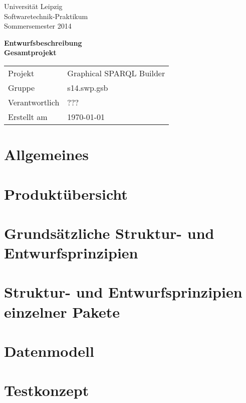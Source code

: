 \def\verantwortlicher{???} %
\thispagestyle{empty} 

\vspace*{2\baselineskip}

\begin{center}
\sffamily
Universität Leipzig\\
Softwaretechnik-Praktikum\\
Sommersemester 2014
\baselineskip

\bgroup
\Huge\textbf{Entwurfsbeschreibung\\ Gesamtprojekt}
\egroup
{}\baselineskip

\begin{tabular}{ll}
Projekt & Graphical SPARQL Builder \\
Gruppe & s14.swp.gsb \\
Verantwortlich & \verantwortlicher\\
Erstellt am & \today \\
\end{tabular}
\end{center}

\vfill%

\tableofcontents

\pagebreak



\section{Allgemeines}

\section{Produktübersicht}

\section{Grundsätzliche Struktur- und Entwurfsprinzipien}

\section{Struktur- und Entwurfsprinzipien einzelner Pakete}

\section{Datenmodell}

\section{Testkonzept}

